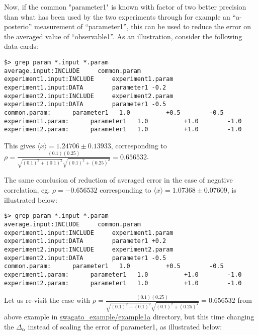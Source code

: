 \documentclass[12pt,a4paper,dvips]{article}
\begin{document}
Now, if the common "parameter1" is known with factor of two better precision than 
what has been used by the two experiments through for example an ``a-posterio'' 
measurement of ``parameter1'', this can be used to reduce the error on the averaged value of ``observable1''.
As an illustration, consider the following data-cards:
\vspace*{-.5cm}
\begin{verbatim}
$> grep param *.input *.param 
average.input:INCLUDE     common.param
experiment1.input:INCLUDE     experiment1.param
experiment1.input:DATA        parameter1 -0.2
experiment2.input:INCLUDE     experiment2.param
experiment2.input:DATA        parameter1 -0.5
common.param:      parameter1   1.0          +0.5        -0.5
experiment1.param:      parameter1   1.0          +1.0        -1.0
experiment2.param:      parameter1   1.0          +1.0        -1.0
\end{verbatim}
\vspace*{-.5cm}
This gives $\langle x \rangle = 1.24706 \pm 0.13933$, 
corresponding to $\rho = \frac{(0.1)(0.25)}{\sqrt{(0.1)^2+(0.1)^2}\sqrt{(0.1)^2+(0.25)^2}} = 0.656532$.


The same conclusion of reduction of averaged error in the case of negative correlation, 
eg. $\rho = -0.656532$ corresponding to $\langle x \rangle = 1.07368 \pm 0.07609$, 
is illustrated below:
\vspace*{-.5cm}
\begin{verbatim}
$> grep param *.input *.param 
average.input:INCLUDE     common.param
experiment1.input:INCLUDE     experiment1.param
experiment1.input:DATA        parameter1 +0.2
experiment2.input:INCLUDE     experiment2.param
experiment2.input:DATA        parameter1 -0.5
common.param:      parameter1   1.0          +0.5        -0.5
experiment1.param:      parameter1   1.0          +1.0        -1.0
experiment2.param:      parameter1   1.0          +1.0        -1.0
\end{verbatim}
\vspace*{-.5cm}

Let us re-visit the case with $\rho = \frac{(0.1)(0.25)}{\sqrt{(0.1)^2+(0.1)^2}\sqrt{(0.1)^2+(0.25)^2}} = 0.656532$
from above example in \url{swagato_example/example1a} directory,
but this time changing the $\Delta_\alpha$ instead of scaling the error of parameter1, as illustrated below:
\end{document}
